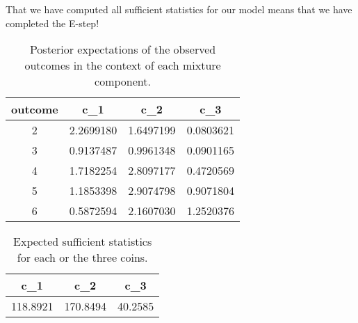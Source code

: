That we have computed all sufficient statistics
for our model means that we have completed the E-step!

\begin{table}
\center

\begin{tabular}{c|c|c|c}
\hline
outcome & c\_1 & c\_2 & c\_3\\
\hline
2 & 2.2699180 & 1.6497199 & 0.0803621\\
\hline
3 & 0.9137487 & 0.9961348 & 0.0901165\\
\hline
4 & 1.7182254 & 2.8097177 & 0.4720569\\
\hline
5 & 1.1853398 & 2.9074798 & 0.9071804\\
\hline
6 & 0.5872594 & 2.1607030 & 1.2520376\\
\hline
\end{tabular}


\caption{Posterior expectations of the observed outcomes in the context of each mixture component.}
\label{tab:binomCounts}
\end{table}

\begin{table}
\center 

\begin{tabular}{c|c|c}
\hline
c\_1 & c\_2 & c\_3\\
\hline
118.8921 & 170.8494 & 40.2585\\
\hline
\end{tabular}


\caption{Expected sufficient statistics for each or the three coins.}
\label{tab:binomPosteriors}
\end{table}



